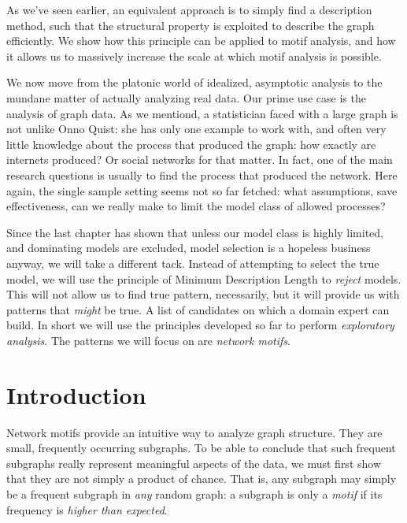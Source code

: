 As we've seen earlier, an equivalent approach is to simply find a description method, such that the structural property is exploited to describe the graph efficiently. We show how this principle can be applied to motif analysis, and how it allows us to massively increase the scale at which motif analysis is possible. 

We now move from the platonic world of idealized, asymptotic analysis to the mundane matter of actually analyzing real data. Our prime use case is the analysis of graph data. As we mentiond, a statistician faced with a large graph is not unlike Onno Quist: she has only one example to work with, and often very little knowledge about the process that produced the graph: how exactly are internets produced? Or social networks for that matter. In fact, one of the main research questions is usually to find the process that produced the network. Here again, the single sample setting seems not so far fetched: what assumptions, save effectiveness, can we really make to limit the model class of allowed processes? 

Since the last chapter has shown that unless our model class is highly limited, and dominating models are excluded, model selection is a hopeless business anyway, we will take a different tack. Instead of attempting to select the true model, we will use the principle of Minimum Description Length to \emph{reject} models. This will not allow us to find true pattern, necessarily, but it will provide us with patterns that \emph{might} be true. A list of candidates on  which a domain expert can build. In short we will use the principles developed so far to perform \emph{exploratory analysis}. The patterns we will focus on are \emph{network motifs}.   


\section{Introduction}

Network motifs \cite{milo2002network} provide an intuitive way to analyze graph structure. They are small, frequently occurring subgraphs. To be able to conclude that such frequent subgraphs really represent meaningful aspects of the data, we must first show that they are not simply a product of chance. That is, any subgraph may simply be a frequent subgraph in \emph{any} random graph: a subgraph is only a \emph{motif} if its frequency is \emph{higher than expected}.

